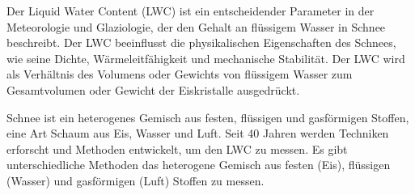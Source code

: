 Der Liquid Water Content (LWC) ist ein entscheidender Parameter in der Meteorologie und Glaziologie, der den Gehalt an flüssigem Wasser in Schnee beschreibt. Der LWC beeinflusst die physikalischen Eigenschaften des Schnees, wie seine Dichte, Wärmeleitfähigkeit und mechanische Stabilität. Der LWC wird als Verhältnis des Volumens oder Gewichts von flüssigem Wasser zum Gesamtvolumen oder Gewicht der Eiskristalle ausgedrückt.

Schnee ist ein heterogenes Gemisch aus festen, flüssigen und gasförmigen Stoffen, eine Art Schaum aus Eis, Wasser und Luft. Seit 40 Jahren werden Techniken erforscht und Methoden entwickelt, um den LWC zu messen. Es gibt unterschiedliche Methoden das heterogene Gemisch aus festen (Eis), flüssigen (Wasser) und gasförmigen (Luft) Stoffen zu messen.
